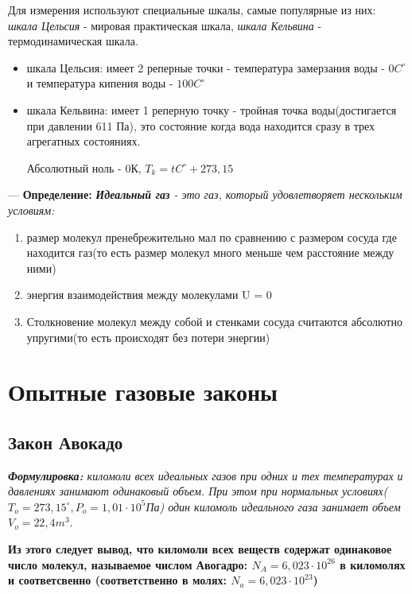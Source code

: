 \documentclass[12pt,a4paper]{report}
\begin{document}
\vspace{5px}

Для измерения используют специальные шкалы, самые популярные из них: \textit{шкала Цельсия}  - мировая практическая шкала, \textit{шкала Кельвина} - термодинамическая шкала.
\begin{itemize}
    \item шкала Цельсия: имеет 2 реперные точки - температура замерзания воды - $0 C^{\circ}$ и температура кипения воды - $100 C^{\circ}$
    \item шкала Кельвина: имеет 1 реперную точку - тройная точка воды(достигается при давлении 611 Па), это состояние когда вода находится сразу в трех агрегатных состояниях.

          Абсолютный ноль - 0К, $T_k = tC^{\circ} + 273,15$
\end{itemize}

--- \textbf{Определение:} \textit{\textbf{Идеальный газ} - это газ, который удовлетворяет нескольким условиям:}
\begin{enumerate}
    \item размер молекул пренебрежительно мал по сравнению с размером сосуда где находится газ(то есть размер молекул много меньше чем расстояние между ними)
    \item энергия взаимодействия между молекулами U = 0
    \item Столкновение молекул между собой и стенками сосуда считаются абсолютно упругими(то есть происходят без потери энергии)
\end{enumerate}
\section{Опытные газовые законы}

\subsection{Закон Авокадо}
\textit{\textbf{Формулировка:} киломоли всех идеальных газов при одних и тех температурах и давлениях занимают одинаковый объем. При этом при нормальных условиях($T_o = 273,15^{\circ}, P_o = 1,01 \cdot 10^5$Па) один киломоль идеального газа занимает объем $V_o = 22,4m^3$}.

\vspace{5px}

\textbf{Из этого следует вывод, что киломоли всех веществ содержат одинаковое число молекул, называемое числом Авогадро:
    $N_A = 6,023 \cdot 10^{26}$ в киломолях и соответсвенно (соответственно в молях: $N_a = 6,023 \cdot 10^{23}$)}
\end{document}
